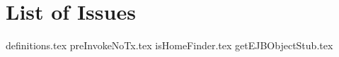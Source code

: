 \section{List of Issues} %
\label{sec:list_of_issues}
{definitions.tex}
{preInvokeNoTx.tex}
{isHomeFinder.tex}
{getEJBObjectStub.tex}
